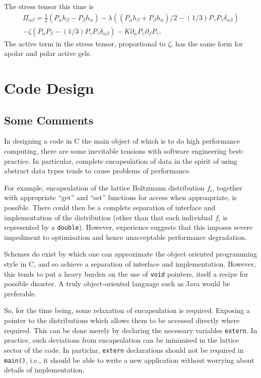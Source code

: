 The stress tensor this time is 
\begin{eqnarray}
\Pi_{\alpha\beta} =
\frac{1}{2}\left(P_\alpha h_\beta - P_\beta h_\alpha \right)
- \lambda\left( (P_\alpha h_\beta + P_\beta h_\alpha)/2 
- (1/3)P_\gamma P_\gamma \delta_{\alpha\beta} \right)
\\
-  \zeta ( P_\alpha P_\beta - (1/3)P_\gamma P_\gamma \delta_{\alpha\beta})
- K \partial_\alpha P_\gamma \partial_\beta P_\gamma.
\end{eqnarray}
The active term in the stress tensor, proportional
to $\zeta$, has the same form for apolar and polar active gels. 

\section{Code Design}

\subsection{Some Comments}

In designing a code in C the main object of which is to do high
performance computing, there are some inevitable tensions with
software engineering best-practice. In particular, complete
encapsulation of data in the spirit of using abstract data types
tends to cause problems of performance.

For example, encapsulation of the lattice Boltzmann distribution
$f_i$, together with appropriate ``get'' and ``set'' functions for
access when approapriate, is possible. There could then be a
complete separation of interface and implementation of the
distribution (other than that each individual $f_i$ is represented
by a \texttt{double}). However, experience suggests that
this imposes severe impediment to optimisation and hence
unacceptable performance degradation.

Schemes do exist by which one can approximate the object
oriented programming style in C, and so achieve a separation
of interface and implementation. However, this tends to put
a heavy burden on the use of \texttt{void} pointers, itself
a recipe for possible disaster. A truly object-oriented
language such as Java would be preferable.

So, for the time being, some relaxation of encapsulation is required.
Exposing a pointer to the distributions which allows them to be accessed
directly where required. This can be done merely by declaring the
necessary variables \texttt{extern}. In practice, such deviations
from encapsulation can be minimised in the lattice sector of the
code. In particlar, \texttt{extern} declarations should not be
required in \texttt{main()}, i.e., it should be able to write a
new application without worrying about details of implementation.

